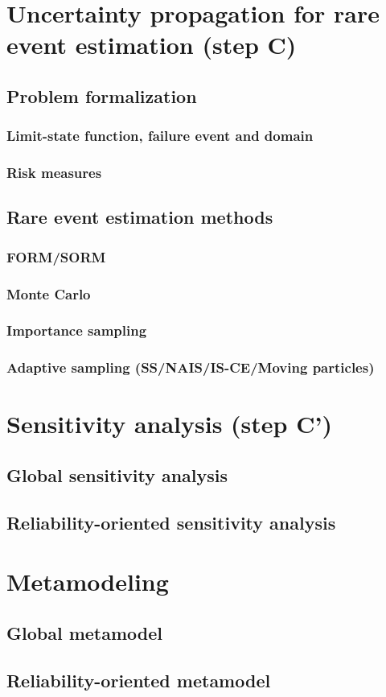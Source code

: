     \section{Uncertainty propagation for rare event estimation (step C)}
        \subsection{Problem formalization}
            \subsubsection{Limit-state function, failure event and domain}
            \subsubsection{Risk measures }
        \subsection{Rare event estimation methods}
            \subsubsection{FORM/SORM}
            \subsubsection{Monte Carlo}
            \subsubsection{Importance sampling}
            \subsubsection{Adaptive sampling (SS/NAIS/IS-CE/Moving particles)}
    \section{Sensitivity analysis (step C')}
        \subsection{Global sensitivity analysis}
        \subsection{Reliability-oriented sensitivity analysis}
    \section{Metamodeling}
        \subsection{Global metamodel}
        \subsection{Reliability-oriented metamodel}